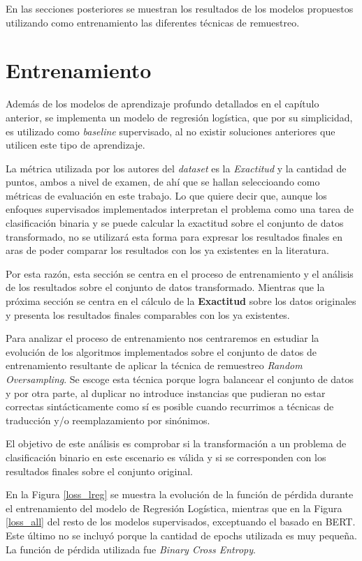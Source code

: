 En las secciones posteriores se muestran los resultados de los modelos propuestos utilizando como entrenamiento las diferentes técnicas de remuestreo.

\section{Entrenamiento}

Además de los modelos de aprendizaje profundo detallados en el capítulo anterior, se implementa un modelo de regresión logística, que por su simplicidad, es utilizado como \textit{baseline} supervisado, al no existir soluciones anteriores que utilicen este tipo de aprendizaje.

La métrica utilizada por los autores del \textit{dataset} es la \textit{Exactitud} y la cantidad de puntos, ambos a nivel de examen, de ahí que se hallan seleccioando como métricas de evaluación en este trabajo. Lo que quiere decir que, aunque los enfoques supervisados implementados interpretan el problema como una tarea de clasificación binaria y se puede calcular la exactitud sobre el conjunto de datos transformado, no se utilizará esta forma para expresar los resultados finales en aras de poder comparar los resultados con los ya existentes en la literatura.

Por esta razón, esta sección se centra en el proceso de entrenamiento y el análisis de los resultados sobre el conjunto de datos transformado. Mientras que la próxima sección se centra en el cálculo de la \textbf{Exactitud} sobre los datos originales y presenta los resultados finales comparables con los ya existentes.

Para analizar el proceso de entrenamiento nos centraremos en estudiar la evolución de los algoritmos implementados sobre el conjunto de datos de entrenamiento resultante de aplicar la técnica de remuestreo \textit{Random Oversampling}. Se escoge esta técnica porque logra balancear el conjunto de datos y por otra parte, al duplicar no introduce instancias que pudieran no estar correctas sintácticamente como sí es posible cuando recurrimos a técnicas de traducción  y/o reemplazamiento por sinónimos.

El objetivo de este análisis es comprobar si la transformación a un problema de clasificación binario en este escenario es válida y si se corresponden con los resultados finales sobre el conjunto original.

En la Figura \ref{loss_lreg} se muestra la evolución de la función de pérdida durante el entrenamiento del modelo de Regresión Logística, mientras que en la Figura \ref{loss_all} del resto de los modelos supervisados, exceptuando el basado en BERT. Este último no se incluyó porque la cantidad de epochs utilizada es muy pequeña. La función de pérdida utilizada fue \textit{Binary Cross Entropy}.

